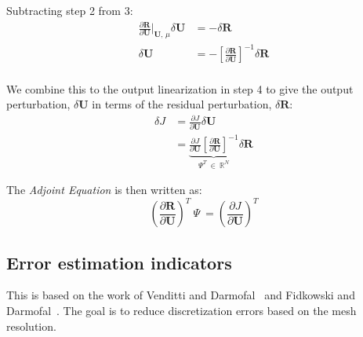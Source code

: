 Subtracting step 2 from 3:
\begin{equation}
\begin{split}
\frac{\partial \textbf{R}} {\partial \textbf{U}} \bigg|_{\textbf{U, $\mu$}} \delta \mathbf{U} &= - \delta \mathbf{R} \\
\delta \textbf{U} &= - \left[\frac{\partial \textbf{R}}{\partial \textbf{U}} \right]^{-1} \delta \textbf{R} \\
\end{split}
\end{equation}

We combine this to the output linearization in step 4 to give the output perturbation, $\delta \textbf{U}$ in terms of the residual perturbation, $\delta \textbf{R}$:
\begin{equation}
\begin{split}
\delta J &= \frac{\partial J}{\partial \mathbf{U}} \delta \textbf{U} \\
& = \underbrace{\frac{\partial J}{\partial \mathbf{U}} \left[\frac{\partial \textbf{R}}{\partial \textbf{U}} \right]^{-1}}_{\Psi^T ~\in~ \mathbb{R}^\textit{N}} \delta \textbf{R}
\end{split}
\end{equation}

The \textit{Adjoint Equation} is then written as:
\begin{equation}
\left( \frac{\partial \textbf{R}}{\partial \textbf{U}} \right)^T ~\Psi~ = \left(\frac{\partial J}{\partial \textbf{U}}\right)^T
\end{equation}


\subsection{Error estimation indicators} \label{subsection:ErrEstInd}
This is based on the work of Venditti and Darmofal~\cite{Venditti:2000} and Fidkowski and Darmofal~\cite{Fidkowski:2011}. The goal is to reduce discretization errors based on the mesh resolution.

